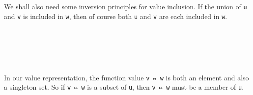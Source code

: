 We shall also need some inversion principles for value inclusion. If the
union of \texttt{u} and \texttt{v} is included in \texttt{w}, then of
course both \texttt{u} and \texttt{v} are each included in \texttt{w}.

\begin{fence}
\begin{code}%
\>[0]%
\>[1847I]\AgdaSymbol{:}\AgdaSpace{}%
\AgdaSpace{}%
\AgdaSpace{}%
\AgdaSpace{}%
\AgdaSymbol{:}\AgdaSpace{}%
\AgdaSymbol{\}}\<%
\\
\>[.][@{}l@{}]\<[1847I]%
\>[7]%
\>[1853I]\AgdaSymbol{(}\AgdaSpace{}%
\AgdaSpace{}%
\AgdaSymbol{)}\AgdaSpace{}%
\AgdaSpace{}%
\<%
\\
\>[.][@{}l@{}]\<[1853I]%
\>[9]\AgdaComment{---------------}\<%
\\
%
\>[7]\AgdaSpace{}%
\AgdaSpace{}%
\AgdaSpace{}%
%
\>[16]%
\>[19]\AgdaSpace{}%
\AgdaSpace{}%
\<%
\\
\>[0]\AgdaSpace{}%
\AgdaSpace{}%
\AgdaSymbol{=}\AgdaSpace{}%
\AgdaSpace{}%
\AgdaSpace{}%
\AgdaSpace{}%
\AgdaSpace{}%
\AgdaSpace{}%
\AgdaSymbol{(}\AgdaSpace{}%
\AgdaSymbol{))}\AgdaSpace{}%
\AgdaOperator{\AgdaInductiveConstructor{,}}\AgdaSpace{}%
\AgdaSpace{}%
\AgdaSpace{}%
\AgdaSpace{}%
\AgdaSpace{}%
\AgdaSymbol{(}\AgdaSpace{}%
\AgdaSymbol{))}\AgdaSpace{}%
\<%
\end{code}
\end{fence}

In our value representation, the function value \texttt{v\ ↦\ w} is both
an element and also a singleton set. So if \texttt{v\ ↦\ w} is a subset
of \texttt{u}, then \texttt{v\ ↦\ w} must be a member of \texttt{u}.

